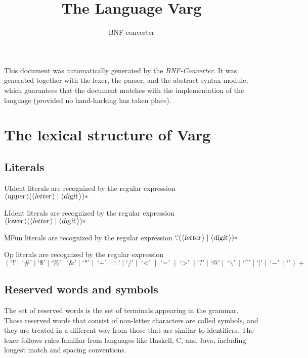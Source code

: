 \documentclass[a4paper,11pt]{article}
\author{BNF-converter}
\title{The Language Varg}
\begin{document}
\maketitle

\newcommand{\emptyP}{\mbox{$\epsilon$}}
\newcommand{\terminal}[1]{\mbox{{\texttt {#1}}}}
\newcommand{\nonterminal}[1]{\mbox{$\langle \mbox{{\sl #1 }} \! \rangle$}}
\newcommand{\arrow}{\mbox{::=}}
\newcommand{\delimit}{\mbox{$|$}}
\newcommand{\reserved}[1]{\mbox{{\texttt {#1}}}}
\newcommand{\literal}[1]{\mbox{{\texttt {#1}}}}
\newcommand{\symb}[1]{\mbox{{\texttt {#1}}}}

This document was automatically generated by the {\em BNF-Converter}. It was generated together with the lexer, the parser, and the abstract syntax module, which guarantees that the document matches with the implementation of the language (provided no hand-hacking has taken place).

\section*{The lexical structure of Varg}

\subsection*{Literals}









UIdent literals are recognized by the regular expression
\({\nonterminal{upper}} ({\nonterminal{letter}} \mid {\nonterminal{digit}})*\)

LIdent literals are recognized by the regular expression
\({\nonterminal{lower}} ({\nonterminal{letter}} \mid {\nonterminal{digit}})*\)

MFun literals are recognized by the regular expression
\(\mbox{`.'} ({\nonterminal{letter}} \mid {\nonterminal{digit}})*\)

Op literals are recognized by the regular expression
\((\mbox{`!'} \mid \mbox{`\#'} \mid \mbox{`\$'} \mid \mbox{`\%'} \mid \mbox{`\&'} \mid \mbox{`*'} \mid \mbox{`{$+$}'} \mid \mbox{`.'} \mid \mbox{`/'} \mid \mbox{`{$<$}'} \mid \mbox{`{$=$}'} \mid \mbox{`{$>$}'} \mid \mbox{`?'} \mid \mbox{`@'} \mid \mbox{`$\backslash$'} \mid \mbox{`{\textasciicircum}'} \mid \mbox{`{$|$}'} \mid \mbox{`{$-$}'} \mid \mbox{`\~{}'})+\)


\subsection*{Reserved words and symbols}
The set of reserved words is the set of terminals appearing in the grammar. Those reserved words that consist of non-letter characters are called symbols, and they are treated in a different way from those that are similar to identifiers. The lexer follows rules familiar from languages like Haskell, C, and Java, including longest match and spacing conventions.
\end{document}
